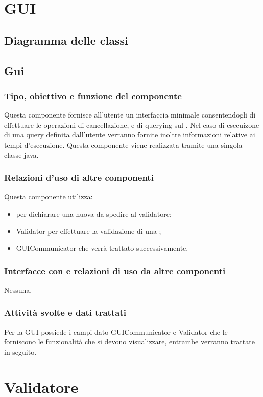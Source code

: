 \documentclass[11pt,titlepage,a4paper]{report}
\begin{document}
\section{GUI}
\subsection{Diagramma delle classi}
\subsection{Gui}
\subsubsection{Tipo, obiettivo e funzione del componente}
Questa componente fornisce all'utente un interfaccia minimale consentendogli di effettuare le operazioni di cancellazione, e di querying sul \re.
Nel caso di esecuizone di una query definita dall'utente verranno fornite inoltre informazioni relative ai tempi d'esecuzione.
Questa componente viene realizzata tramite una singola classe java.
\subsubsection{Relazioni d'uso di altre componenti}
Questa componente utilizza:
\begin{itemize}
 \item \BR per dichiarare una nuova \br da spedire al validatore;
 \item Validator per effettuare la validazione di una \br;
 \item GUICommunicator che verr\`a trattato successivamente.
\end{itemize}
\subsubsection{Interfacce con e relazioni di uso da altre componenti}
Nessuna.
\subsubsection{Attivit\`a svolte e dati trattati}
Per la GUI possiede i campi dato GUICommunicator e Validator che le forniscono le funzionalit\`a che si devono visualizzare, entrambe verranno trattate in seguito.

\section{Validatore}
\end{document}
